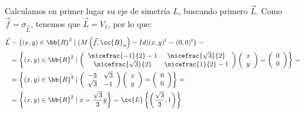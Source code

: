 \begin{ejercicio}
\begin{enumerate}
        Calculamos en primer lugar su eje de simetría $L$, buscando primero $\vec{L}$. Como $\vec{f}=\sigma_{\vec{L}}$, tenemos que $\vec{L}=V_1$, por lo que:
        \begin{equation*}
            \begin{split}
                \vec{L} &= \{ (x,y)\in \bb{R}^2 \mid (M\left(\vec{f}, \cc{B}_u\right) - Id) (x,y)^t = (0,0)^t \} =\\
                &= \left\{ (x,y)\in \bb{R}^2 \mid \left(
                \begin{array}{cc}
                    \nicefrac{-1}{2}-1 & \nicefrac{\sqrt{3}}{2} \\
                    \nicefrac{\sqrt{3}}{2} & \nicefrac{1}{2}-1
                \end{array}
                \right)
                \left(
                \begin{array}{c}
                    x\\y
                \end{array}
                \right)
                = \left(
                \begin{array}{c}
                    0\\0
                \end{array}
                \right)
                \right\} =\\
                &= \left\{ (x,y)\in \bb{R}^2 \mid \left(
                \begin{array}{cc}
                    -3 & \sqrt{3} \\
                    \sqrt{3} & -1 \\
                \end{array}
                \right)
                \left(
                \begin{array}{c}
                    x\\y
                \end{array}
                \right)
                = \left(
                \begin{array}{c}
                    0\\0
                \end{array}
                \right)
                \right\} =\\
                &= \left\{ (x,y)\in \bb{R}^2 \mid x = \frac{\sqrt{3}}{3} y
                \right\} = \cc{L}\left\{\left(\frac{\sqrt{3}}{3}, 1\right)\right\}
            \end{split}
        \end{equation*}


\end{enumerate}
\end{ejercicio}
